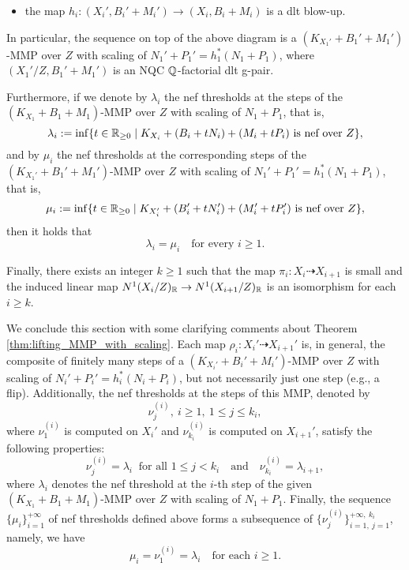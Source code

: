 \begin{thm}
\begin{itemize}
			\item the map $ h_i \colon (X_i',B_i'+M_i') \to (X_i,B_i+M_i) $ is a dlt blow-up.
		\end{itemize}
		In particular, the sequence on top of the above diagram is a $ (K_{X_1'}+B_1'+M_1') $-MMP over $ Z $ with scaling of $ N_1' + P_1' = h_1^* (N_1 + P_1) $, where $ (X_1'/Z,B_1'+M_1') $ is an NQC $ \mathbb{Q} $-factorial dlt g-pair.
		
		Furthermore, if we denote by $\lambda_i$ the nef thresholds at the steps of the $(K_{X_1} + B_1 + M_1)$-MMP over $Z$ with scaling of $ N_1 + P_1 $, that is,
		\[ \lambda_i := \inf \{ t \in \mathbb{R}_{\geq 0} \mid K_{X_i} + (B_i + t N_i) + (M_i + t P_i) \text{ is nef over } Z \} , \]
		and by $\mu_i$ the nef thresholds at the corresponding steps of the $ (K_{X_1'}+B_1'+M_1') $-MMP over $ Z $ with scaling of $ N_1' + P_1' = h_1^* (N_1 + P_1) $, that is,
		\[ \mu_i := \inf \{ t \in \mathbb{R}_{\geq 0} \mid K_{X_i'} + (B_i' + t N_i') + (M_i' + t P_i') \text{ is nef over } Z \} , \]
		then it holds that 
		\[ \lambda_i = \mu_i \quad \text{for every } i \geq 1 . \]
		
		Finally, there exists an integer $k \geq 1$ such that the map $ \pi_i \colon X_i \dashrightarrow X_{i+1} $ is small and the induced linear map $ N^1(X_i/Z)_{\mathbb{R}} \to N^1(X_{i+1}/Z)_{\mathbb{R}} $ is an isomorphism for each $ i \geq k $.
	\end{thm}
	
	We conclude this section with some clarifying comments about Theorem \ref{thm:lifting_MMP_with_scaling}. 
	Each map $ \rho_i \colon X_i' \dashrightarrow X_{i+1}' $ is, in general, the composite of finitely many steps of a $(K_{X_i'}+B_i'+M_i')$-MMP over $ Z $ with scaling of $ N_i' + P_i' = h_i^* (N_i + P_i) $, but not necessarily just one step (e.g., a flip). Additionally, the nef thresholds at the steps of this MMP, denoted by 
	$$ \nu_j^{(i)} , \ i \geq 1 , \ 1 \leq j \leq k_i , $$ 
	where $ \nu_1^{(i)}$ is computed on $X_i'$ and $ \nu_{k_i}^{(i)} $ is computed on $X_{i+1}'$, 
	satisfy the following properties:
	\[ \nu_j^{(i)} = \lambda_i \ \text{ for all } 1 \leq j < k_i \quad \text{and} \quad \nu_{k_i}^{(i)} = \lambda_{i+1} , \]
	where $ \lambda_i $ denotes the nef threshold at the $i$-th step of the given $(K_{X_1} + B_1 + M_1)$-MMP over $Z$ with scaling of $ N_1 + P_1 $. Finally, the sequence $ \{ \mu_i \}_{i=1}^{+\infty} $ of nef thresholds defined above forms a subsequence of $ \big\{ \nu_j^{(i)} \big\}_{i=1, \ j=1}^{+\infty, \ k_i} $, namely, we have
	\[ \mu_i = \nu_1^{(i)} = \lambda_i \quad \text{for each } i \geq 1 . \]
	
